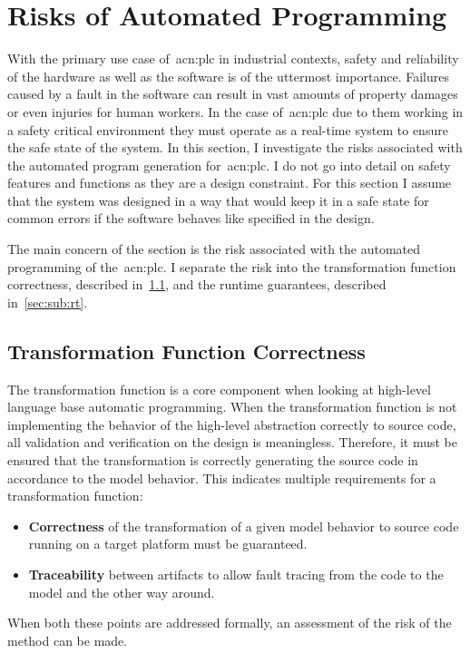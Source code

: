 \section{Risks of Automated Programming}
\label{sec:risks}

With the primary use case of~\acrshort{acn:plc} in industrial contexts, safety and reliability of the hardware as well as the software is of the uttermost importance.
Failures caused by a fault in the software can result in vast amounts of property damages or even injuries for human workers.
In the case of~\acrshort{acn:plc} due to them working in a safety critical environment they must operate as a real-time system to ensure the safe state of the system.
In this section, I investigate the risks associated with the automated program generation for~\acrshort{acn:plc}.
I do not go into detail on safety features and functions as they are a design constraint.
For this section I assume that the system was designed in a way that would keep it in a safe state for common errors if the software behaves like specified in the design.

The main concern of the section is the risk associated with the automated programming of the~\acrshort{acn:plc}.
I separate the risk into the transformation function correctness, described in~\ref{sec:sub:trans}, and the runtime guarantees, described in~\ref{sec:sub:rt}. 
\subsection{Transformation Function Correctness}
\label{sec:sub:trans}
The transformation function is a core component when looking at high-level language base automatic programming.
When the transformation function is not implementing the behavior of the high-level abstraction correctly to source code, all validation and verification on the design is meaningless.
Therefore, it must be ensured that the transformation is correctly generating the source code in accordance to the model behavior.
This indicates multiple requirements for a transformation function:
\begin{itemize}
	\item \textbf{Correctness} of the transformation of a given model behavior to source code running on a target platform must be guaranteed.
	\item \textbf{Traceability} between artifacts to allow fault tracing from the code to the model and the other way around. 
\end{itemize}
When both these points are addressed formally, an assessment of the risk of the method can be made.


